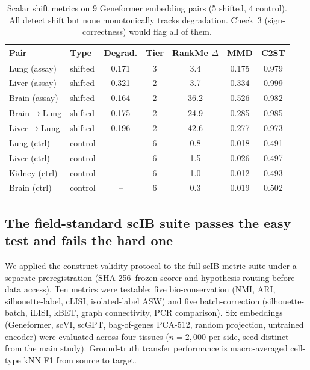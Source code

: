 \documentclass[10pt,letterpaper]{article}
\begin{document}
\begin{table}[t]
\centering
\caption{Scalar shift metrics on 9 Geneformer embedding pairs (5 shifted, 4 control). All detect shift but none monotonically tracks degradation. Check~3 (sign-correctness) would flag all of them.}
\label{tab:scalar}
\small
\begin{tabular}{@{}llccccc@{}}
\toprule
Pair & Type & Degrad. & Tier & RankMe $\Delta$ & MMD & C2ST \\
\midrule
Lung (assay)  & shifted & 0.171 & 3 & 3.4  & 0.175 & 0.979 \\
Liver (assay) & shifted & 0.321 & 2 & 3.7  & 0.334 & 0.999 \\
Brain (assay) & shifted & 0.164 & 2 & 36.2 & 0.526 & 0.982 \\
Brain$\to$Lung  & shifted & 0.175 & 2 & 24.9 & 0.285 & 0.985 \\
Liver$\to$Lung  & shifted & 0.196 & 2 & 42.6 & 0.277 & 0.973 \\
\midrule
Lung (ctrl)   & control & -- & 6 & 0.8 & 0.018 & 0.491 \\
Liver (ctrl)  & control & -- & 6 & 1.5 & 0.026 & 0.497 \\
Kidney (ctrl) & control & -- & 6 & 1.0 & 0.012 & 0.493 \\
Brain (ctrl)  & control & -- & 6 & 0.3 & 0.019 & 0.502 \\
\bottomrule
\end{tabular}
\end{table}

\subsection{The field-standard scIB suite passes the easy test and fails the hard one}
\label{sec:scib}

We applied the construct-validity protocol to the full scIB metric suite \citep{luecken2022scib} under a separate preregistration (SHA-256--frozen scorer and hypothesis routing before data access). Ten metrics were testable: five bio-conservation (NMI, ARI, silhouette-label, cLISI, isolated-label ASW) and five batch-correction (silhouette-batch, iLISI, kBET, graph connectivity, PCR comparison). Six embeddings (Geneformer, scVI, scGPT, bag-of-genes PCA-512, random projection, untrained encoder) were evaluated across four tissues ($n = 2{,}000$ per side, seed distinct from the main study). Ground-truth transfer performance is macro-averaged cell-type kNN F1 from source to target.
\end{document}
